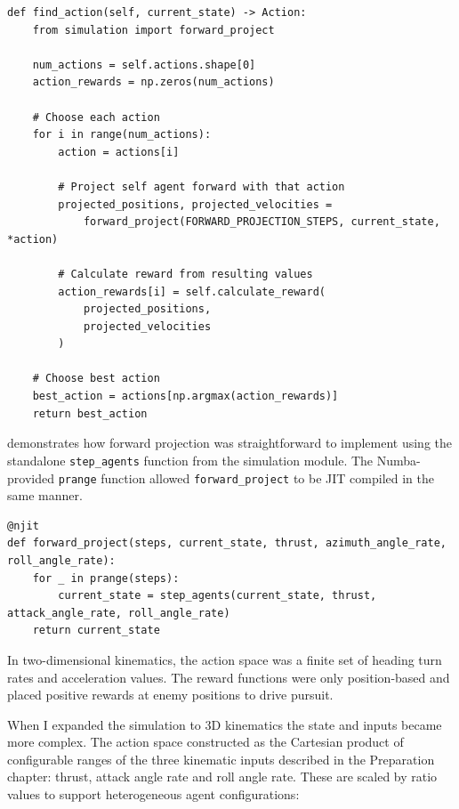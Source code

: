 \begin{listing}[H]
\begin{verbatim}
def find_action(self, current_state) -> Action:
    from simulation import forward_project

    num_actions = self.actions.shape[0]
    action_rewards = np.zeros(num_actions)

    # Choose each action
    for i in range(num_actions):
        action = actions[i]

        # Project self agent forward with that action
        projected_positions, projected_velocities = 
            forward_project(FORWARD_PROJECTION_STEPS, current_state, *action)

        # Calculate reward from resulting values
        action_rewards[i] = self.calculate_reward(
            projected_positions, 
            projected_velocities
        )

    # Choose best action
    best_action = actions[np.argmax(action_rewards)]
    return best_action

\end{verbatim}
\caption{\texttt{FastMDP} action selection via forward projection and reward evaluation.}
\label{lst:find_action}
\end{listing}

 demonstrates how forward projection was straightforward to implement using the standalone \texttt{step\_agents} function from the simulation module. The Numba-provided \texttt{prange} function allowed \texttt{forward\_project} to be JIT compiled in the same manner.  

\begin{listing}[H]
\begin{verbatim}
@njit
def forward_project(steps, current_state, thrust, azimuth_angle_rate, roll_angle_rate):
    for _ in prange(steps):
        current_state = step_agents(current_state, thrust, attack_angle_rate, roll_angle_rate)
    return current_state
\end{verbatim}
\caption{Forward projection applies an action to a specific agent for a fixed number of steps.}
\label{lst:forward_project}
\end{listing}

In two-dimensional kinematics, the action space was a finite set of heading turn rates and acceleration values. The reward functions were only position-based and placed positive rewards at enemy positions to drive pursuit.

When I expanded the simulation to 3D kinematics the state and inputs became more complex. The action space constructed as the Cartesian product of configurable ranges of the three kinematic inputs described in the Preparation chapter: thrust, attack angle rate and roll angle rate. These are scaled by ratio values to support heterogeneous agent configurations:

